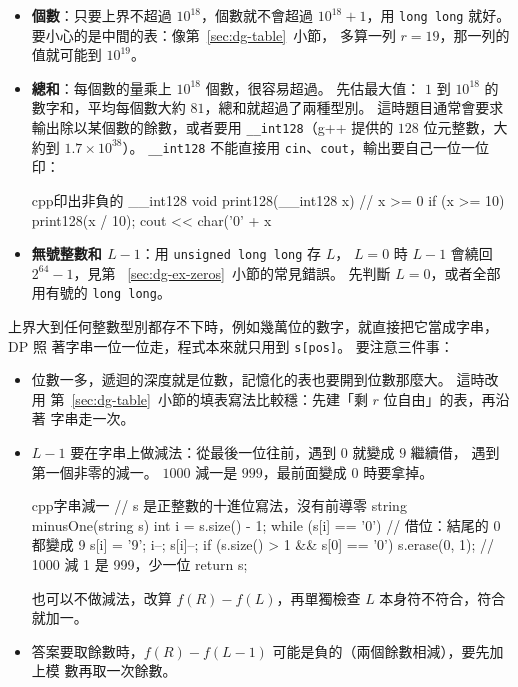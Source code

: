 \begin{itemize}
\item \textbf{個數}：只要上界不超過 $10^{18}$，個數就不會超過 $10^{18} + 1$，用
\texttt{long long} 就好。 要小心的是中間的表：像第~\ref{sec:dg-table}~小節，
多算一列 $r = 19$，那一列的值就可能到 $10^{19}$。
\item \textbf{總和}：每個數的量乘上 $10^{18}$ 個數，很容易超過。 先估最大值：
$1$ 到 $10^{18}$ 的數字和，平均每個數大約 $81$，總和就超過了兩種型別。 這時題目通常會要求輸出除以某個數的餘數，或者要用
\texttt{\_\_int128}（g++ 提供的 $128$ 位元整數，大約到 $1.7 \times 10^{38}$）。
\texttt{\_\_int128} 不能直接用 \texttt{cin}、\texttt{cout}，輸出要自己一位一位
印：
\begin{code}{cpp}{印出非負的 \_\_int128}
void print128(__int128 x) {     // x >= 0
    if (x >= 10) {
        print128(x / 10);
    }
    cout << char('0' + x %
}
\end{code}
\item \textbf{無號整數和 $L - 1$}：用 \texttt{unsigned long long} 存 $L$，
$L = 0$ 時 $L - 1$ 會繞回 $2^{64} - 1$，見第
~\ref{sec:dg-ex-zeros}~小節的常見錯誤。 先判斷 $L = 0$，或者全部用有號的
\texttt{long long}。
\end{itemize}

上界大到任何整數型別都存不下時，例如幾萬位的數字，就直接把它當成字串，DP 照
著字串一位一位走，程式本來就只用到 \texttt{s[pos]}。 要注意三件事：

\begin{itemize}
\item 位數一多，遞迴的深度就是位數，記憶化的表也要開到位數那麼大。 這時改用
第~\ref{sec:dg-table}~小節的填表寫法比較穩：先建「剩 $r$ 位自由」的表，再沿著
字串走一次。
\item $L - 1$ 要在字串上做減法：從最後一位往前，遇到 $0$ 就變成 $9$ 繼續借，
遇到第一個非零的減一。 $1000$ 減一是 $999$，最前面變成 $0$ 時要拿掉。
\begin{code}{cpp}{字串減一}
// s 是正整數的十進位寫法，沒有前導零
string minusOne(string s) {
    int i = s.size() - 1;
    while (s[i] == '0') {        // 借位：結尾的 0 都變成 9
        s[i] = '9';
        i--;
    }
    s[i]--;
    if (s.size() > 1 && s[0] == '0') {
        s.erase(0, 1);           // 1000 減 1 是 999，少一位
    }
    return s;
}
\end{code}
也可以不做減法，改算 $f(R) - f(L)$，再單獨檢查 $L$ 本身符不符合，符合就加一。
\item 答案要取餘數時，$f(R) - f(L - 1)$ 可能是負的（兩個餘數相減），要先加上模
數再取一次餘數。
\end{itemize}

